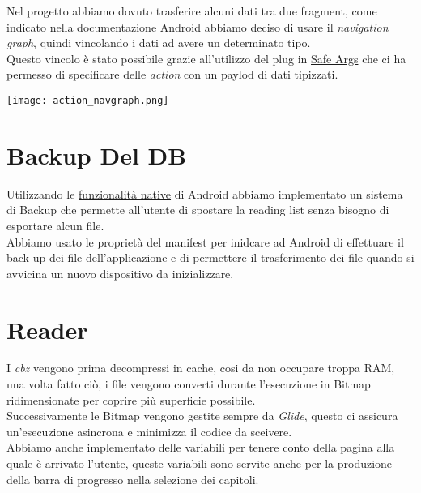 \documentclass[../Assignment-3-LPSMT.tex]{subfiles}
\begin{document}
Nel progetto abbiamo dovuto trasferire alcuni dati tra due fragment, come indicato nella documentazione Android abbiamo deciso di usare il \emph{navigation graph}, quindi vincolando i dati ad avere un determinato tipo.\\
Questo vincolo è stato possibile grazie all'utilizzo del plug in \href{https://developer.android.com/guide/navigation/use-graph/pass-data#Safe-args}{Safe Args} che ci ha permesso di specificare delle \emph{action} con un paylod di dati tipizzati.\\

\begin{center}
  \texttt{[image: action\_navgraph.png]}
\end{center}

\section{Backup Del DB}

Utilizzando le \href{https://developer.android.com/guide/topics/data/autobackup}{funzionalità native} di Android abbiamo implementato un sistema di Backup che permette all'utente di spostare la reading list senza bisogno di esportare alcun file.\\
Abbiamo usato le proprietà del manifest per inidcare ad Android di effettuare il back-up dei file dell'applicazione e di permettere il trasferimento dei file quando si avvicina un nuovo dispositivo da inizializzare.

\section{Reader}

I \emph{cbz} vengono prima decompressi in cache, cosi da non occupare troppa RAM, una volta fatto ciò, i file vengono converti durante l'esecuzione in Bitmap ridimensionate per coprire più superficie possibile.\\
Successivamente le Bitmap vengono gestite sempre da \emph{Glide}, questo ci assicura un'esecuzione asincrona e minimizza il codice da sceivere.\\
Abbiamo anche implementato delle variabili per tenere conto della pagina alla quale è arrivato l'utente, queste variabili sono servite anche per la produzione della barra di progresso nella selezione dei capitoli.
\end{document}
